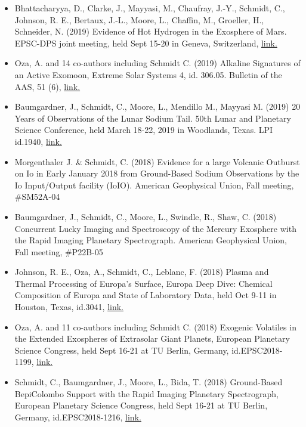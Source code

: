 \documentclass[12pt]{report}
\begin{document}
\begin{itemize}
   \item Bhattacharyya, D., Clarke, J., Mayyasi, M., Chaufray, J.-Y., Schmidt, C., Johnson, R. E., Bertaux, J.-L., Moore, L., Chaffin, M., Groeller, H., Schneider, N. (2019) Evidence of Hot Hydrogen in the Exosphere of Mars. EPSC-DPS joint meeting, held Sept 15-20 in Geneva, Switzerland, \href{https://meetingorganizer.copernicus.org/EPSC-DPS2019/EPSC-DPS2019-960-1.pdf}{link.}
   \item Oza, A. and 14 co-authors including Schmidt C. (2019) Alkaline Signatures of an Active Exomoon, Extreme Solar Systems 4, id. 306.05. Bulletin of the AAS, 51 (6), \href{https://113qx216in8z1kdeyi404hgf-wpengine.netdna-ssl.com/wp-content/uploads/2019/09/exss4_abstracts.pdf#abs306.05}{link.}
   \item Baumgardner, J., Schmidt, C., Moore, L., Mendillo M., Mayyasi M. (2019) 20 Years of Observations of the Lunar Sodium Tail. 50th Lunar and Planetary Science Conference, held March 18-22, 2019 in Woodlands, Texas. LPI id.1940, \href{https://www.hou.usra.edu/meetings/lpsc2019/pdf/1940.pdf}{link.}
   \item Morgenthaler J. \& Schmidt, C. (2018) Evidence for a large Volcanic Outburst on Io in Early January 2018 from Ground-Based Sodium Observations by the Io Input/Output facility (IoIO). American Geophysical Union, Fall meeting, \#SM52A-04
   \item Baumgardner, J., Schmidt, C., Moore, L., Swindle, R., Shaw, C. (2018) Concurrent Lucky Imaging and Spectroscopy of the Mercury Exosphere with the Rapid Imaging Planetary Spectrograph. American Geophysical Union, Fall meeting, \#P22B-05
   \item Johnson, R. E., Oza, A., Schmidt, C., Leblanc, F. (2018) Plasma and Thermal Processing of Europa's Surface, Europa Deep Dive: Chemical Composition of Europa and State of Laboratory Data, held Oct 9-11 in Houston, Texas, id.3041, \href{https://www.hou.usra.edu/meetings/europadeepdive2018/pdf/3041.pdf}{link.} 
   \item Oza, A. and 11 co-authors including Schmidt C. (2018) Exogenic Volatiles in the Extended Exospheres of Extrasolar Giant Planets, European Planetary Science Congress, held Sept 16-21 at TU Berlin, Germany, id.EPSC2018-1199, \href{https://meetingorganizer.copernicus.org/EPSC2018/EPSC2018-1199-2.pdf}{link.} 
   \item Schmidt, C., Baumgardner, J., Moore, L., Bida, T. (2018) Ground-Based BepiColombo Support with the Rapid Imaging Planetary Spectrograph, European Planetary Science Congress, held Sept 16-21 at TU Berlin, Germany, id.EPSC2018-1216, \href{https://meetingorganizer.copernicus.org/EPSC2018/EPSC2018-1216-2.pdf}{link.} 

\end{itemize}
\end{document}
